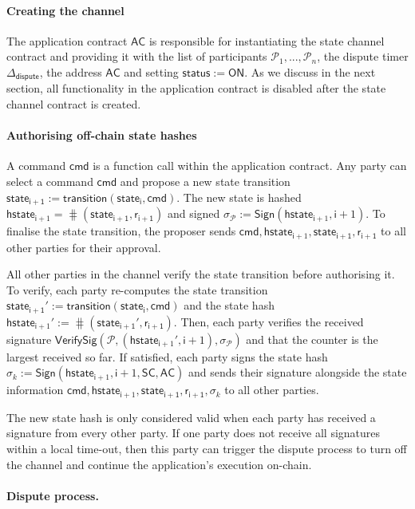 \documentclass{llncs}
\newcommand{\chanstatus}{\mathsf{status}}
\newcommand{\chanon}{\mathsf{ON}}
\newcommand{\cmd}{\mathsf{cmd}}
\newcommand{\hstateplus}{\ensuremath{\mathsf{hstate}_{\monotoniccounter+1}}}
\newcommand{\monotoniccounter}{\mathsf{i}}
\newcommand{\stateinfoi}{\mathsf{state}_{\mathsf{i}}}
\newcommand{\stateinfoplus}{\mathsf{state}_{\mathsf{i+1}}}
\newcommand{\participant}{\mathcal{P}}
\newcommand{\ranplus}{\mathsf{r}_{\mathsf{i+1}}}
\newcommand{\statechannel}{\mathsf{SC}}
\newcommand{\sign}{\mathsf{Sign}}
\newcommand{\verifysig}{\mathsf{VerifySig}}
\newcommand{\appcontract}{\mathsf{AC}}
\newcommand{\timerdispute}{\mathsf{\Delta}_{\mathsf{dispute}}}
\begin{document}
\paragraph{Creating the channel} 

The application contract $\appcontract$ is responsible for instantiating the state channel contract and providing it with the list of participants $\participant_{1},...,\participant_{n}$, the dispute timer $\timerdispute$, the address $\appcontract$ and setting $\chanstatus := \chanon$. 
As we discuss in the next section, all functionality in the application contract is disabled after the state channel contract is created. 

\paragraph{Authorising off-chain state hashes}
A command $\cmd$ is a function call within the application contract.
Any party can select a command $\cmd$ and propose a new state transition $\stateinfoplus := \mathsf{transition}(\stateinfoi, \cmd)$.
The new state is hashed  $\hstateplus = \hash(\stateinfoplus, \ranplus)$ and signed  $\sigma_{\participant} := \sign(\hstateplus,\monotoniccounter+1)$.
To finalise the state transition, the proposer sends $\cmd,\hstateplus, \stateinfoplus, \ranplus$ to all other parties for their approval.

All other parties in the channel verify the state transition before authorising it. 
To verify, each party re-computes the state transition $\stateinfoplus' := \mathsf{transition}(\stateinfoi, \cmd)$ and the state hash $\hstateplus' := \hash(\stateinfoplus', \ranplus)$.
Then, each party verifies the received signature $\verifysig(\participant, (\hstateplus', \monotoniccounter+1), \sigma_{\participant})$ and that the counter is the largest received so far. 
If satisfied, each party signs the state hash  $\sigma_{k} := \sign(\hstateplus,\monotoniccounter+1, \statechannel, \appcontract)$ and sends their signature alongside the state information $\cmd,\hstateplus, \stateinfoplus, \ranplus, \sigma_{k}$ to all other parties. 

The new state hash is only considered valid when each party has received a signature from every other party.  If one party does not receive all signatures within a local time-out, then this party can trigger the dispute process to turn off the channel and continue the application's execution on-chain. 

\paragraph{Dispute process.} 
\end{document}
